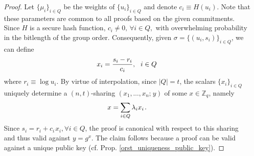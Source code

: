 \documentclass{iacrtrans}
\begin{document}
\begin{proof}
Let $\{\mu_i\}_{i \in Q}$
be the weights of $\{u_i\}_{i \in Q}$
and denote $c_i \equiv H(u_i)$.
Note that these parameters
are common to all proofs based on the
given commitments.
Since $H$ is a secure hash function,
$c_i \neq 0,\hspace{2pt} \forall i \in Q,$
with overwhelming probability in
the bitlength of the group order.
Consequently, given $\sigma = \{(u_i, s_i)\}_{i \in Q}$,
we can define
\vspace{5pt}
\begin{equation*}
x_i = \frac{s_i - r_i}{c_i},
\ \ i \in Q\hspace{1pt}
\vspace{5pt}
\end{equation*}
where $r_i \equiv \log u_i$.
By virtue of interpolation,
since $|Q| = t$, the scalars $\{x_i\}_{i \in Q}$
uniquely determine a $(n, t)$-sharing
$(x_1, \dots, x_n;\hspace{1pt} y)$
of some $x \in \mathbb{Z}_q$, namely
\vspace{5pt}
\begin{equation*}
x = \sum_{i \in Q} \lambda_i x_i\hspace{1pt}.
\vspace{5pt}
\end{equation*}
Since $s_i = r_i + c_i\hspace{1pt}x_i,\forall i \in Q$,
the proof is canonical with respect to this sharing
and thus valid against $y = g ^ x$.
The claim follows because a proof can be valid
against a unique public key
(cf. Prop. \ref{orst_uniqueness_public_key}).
\end{proof}
\end{document}
